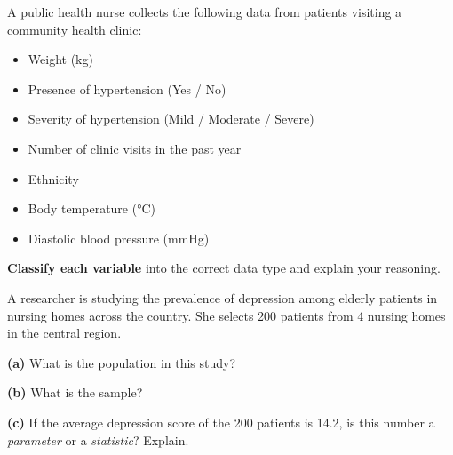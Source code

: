 \documentclass[
  12pt,
  letterpaper,
]{book}
\providecommand{\tightlist}{%
  \setlength{\itemsep}{0pt}\setlength{\parskip}{0pt}}
\begin{document}
\begin{tcolorbox}[enhanced jigsaw, arc=.35mm, bottomrule=.15mm, bottomtitle=1mm, breakable, colback=white, colbacktitle=quarto-callout-caution-color!10!white, colframe=quarto-callout-caution-color-frame, coltitle=black, left=2mm, leftrule=.75mm, opacityback=0, opacitybacktitle=0.6, rightrule=.15mm, title={✏️ Exercise 1}, titlerule=0mm, toprule=.15mm, toptitle=1mm]

A public health nurse collects the following data from patients visiting
a community health clinic:

\begin{itemize}
\tightlist
\item
  Weight (kg)
\item
  Presence of hypertension (Yes / No)
\item
  Severity of hypertension (Mild / Moderate / Severe)
\item
  Number of clinic visits in the past year
\item
  Ethnicity
\item
  Body temperature (°C)
\item
  Diastolic blood pressure (mmHg)
\end{itemize}

\textbf{Classify each variable} into the correct data type and explain
your reasoning.

\end{tcolorbox}

\begin{tcolorbox}[enhanced jigsaw, arc=.35mm, bottomrule=.15mm, bottomtitle=1mm, breakable, colback=white, colbacktitle=quarto-callout-caution-color!10!white, colframe=quarto-callout-caution-color-frame, coltitle=black, left=2mm, leftrule=.75mm, opacityback=0, opacitybacktitle=0.6, rightrule=.15mm, title={✏️ Exercise 2}, titlerule=0mm, toprule=.15mm, toptitle=1mm]

A researcher is studying the prevalence of depression among elderly
patients in nursing homes across the country. She selects 200 patients
from 4 nursing homes in the central region.

\textbf{(a)} What is the population in this study?

\textbf{(b)} What is the sample?

\textbf{(c)} If the average depression score of the 200 patients is
14.2, is this number a \emph{parameter} or a \emph{statistic}? Explain.

\end{tcolorbox}
\end{document}
